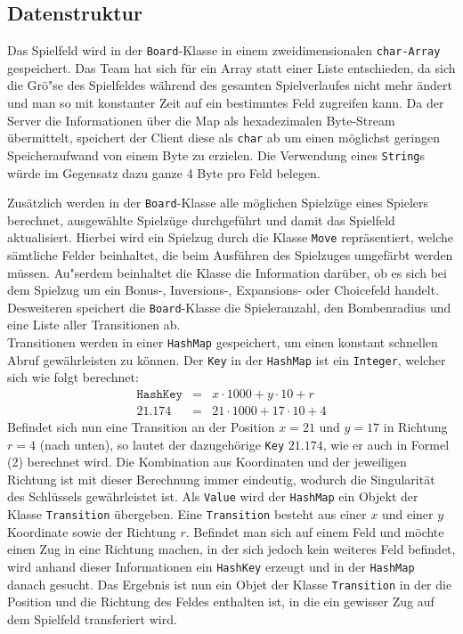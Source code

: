 \newpage

\subsection{Datenstruktur}\label{subsec:datenstruktur}
Das Spielfeld wird in der \texttt{Board}-Klasse in einem zweidimensionalen \texttt{char-Array} gespeichert.
Das Team hat sich f\"ur ein Array statt einer Liste entschieden, da sich die Gr\"o"se des Spielfeldes w\"ahrend des gesamten Spielverlaufes nicht mehr \"andert und man so mit konstanter Zeit auf ein bestimmtes Feld zugreifen kann.
Da der Server die Informationen \"uber die Map als hexadezimalen Byte-Stream \"ubermittelt, speichert der Client diese als \texttt{char} ab um einen m\"oglichst geringen Speicheraufwand von einem Byte zu erzielen.
Die Verwendung eines \texttt{String}s w\"urde im Gegensatz dazu ganze 4 Byte pro Feld belegen.

Zus\"atzlich werden in der \texttt{Board}-Klasse alle m\"oglichen Spielz\"uge eines Spielers berechnet, ausgew\"ahlte Spielz\"uge durchgef\"uhrt und damit das Spielfeld aktualisiert.
Hierbei wird ein Spielzug durch die Klasse \texttt{Move} repr\"asentiert, welche s\"amtliche Felder beinhaltet, die beim Ausf\"uhren des Spielzuges umgef\"arbt werden m\"ussen.
Au"serdem beinhaltet die Klasse die Information dar\"uber, ob es sich bei dem Spielzug um ein Bonus-, Inversions-, Expansions- oder Choicefeld handelt.
Desweiteren speichert die \texttt{Board}-Klasse die Spieleranzahl, den Bombenradius und eine Liste aller Transitionen ab. \\
Transitionen werden in einer \texttt{HashMap} gespeichert, um einen konstant schnellen Abruf gew\"ahr\-leisten zu k\"onnen.
Der \texttt{Key} in der \texttt{HashMap} ist ein \texttt{Integer}, welcher sich wie folgt berechnet:
\begin{align}
    \texttt{HashKey} &=& x \cdot 1000 + y \cdot 10 + r \\
    21.174 &=& 21 \cdot 1000 + 17 \cdot 10 + 4
\end{align}
Befindet sich nun eine Transition an der Position $x=21$ und $y=17$ in Richtung $r=4$ (nach unten), so lautet der dazugeh\"orige \texttt{Key} $21.174$, wie er auch in Formel (2) berechnet wird.
Die Kombination aus Koordinaten und der jeweiligen Richtung ist mit dieser Berechnung immer eindeutig, wodurch die Singularit\"at des Schl\"ussels gew\"ahrleistet ist.
Als \texttt{Value} wird der \texttt{HashMap} ein Objekt der Klasse \texttt{Transition} \"ubergeben.
Eine \texttt{Transition} besteht aus einer $x$ und einer $y$ Koordinate sowie der Richtung $r$.
Befindet man sich auf einem Feld und m\"ochte einen Zug in eine Richtung machen, in der sich jedoch kein weiteres Feld befindet, wird anhand dieser Informationen ein \texttt{HashKey} erzeugt und in der \texttt{HashMap} danach gesucht.
Das Ergebnis ist nun ein Objet der Klasse \texttt{Transition} in der die Position und die Richtung des Feldes enthalten ist, in die ein gewisser Zug auf dem Spielfeld transferiert wird.

